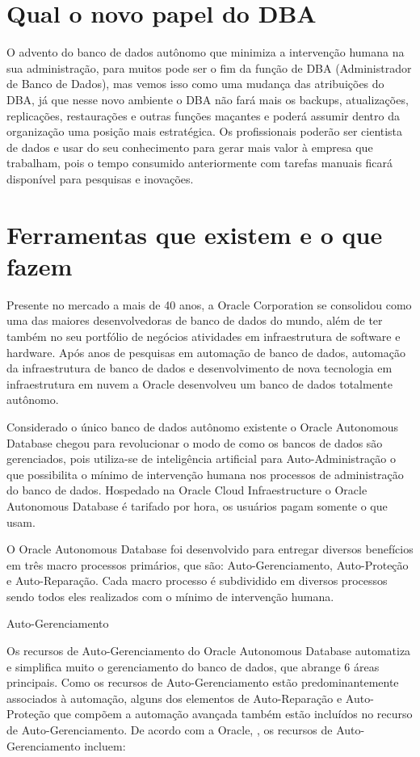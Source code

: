 \section{Qual o novo papel do DBA}

O advento do banco de dados autônomo que minimiza a intervenção humana na sua administração, para muitos pode ser o fim da função de DBA (Administrador de Banco de Dados), mas vemos isso como uma mudança das atribuições do DBA, já que nesse novo ambiente o DBA não fará mais os backups, atualizações, replicações, restaurações e outras funções maçantes e poderá assumir dentro da organização uma posição mais estratégica. Os profissionais poderão ser cientista de dados e usar do seu conhecimento para gerar mais valor à empresa que trabalham, pois o tempo consumido anteriormente com tarefas manuais ficará disponível para pesquisas e inovações.


\section{Ferramentas que existem e o que fazem}

Presente no mercado a mais de 40 anos, a Oracle Corporation se consolidou como uma das maiores desenvolvedoras de banco de dados do mundo, além de ter também no seu portfólio de negócios atividades em infraestrutura de software e hardware.  Após anos de pesquisas em automação de banco de dados, automação da infraestrutura de banco de dados e desenvolvimento de nova tecnologia em infraestrutura em nuvem a Oracle desenvolveu um banco de dados totalmente autônomo.

Considerado o único banco de dados autônomo existente o Oracle Autonomous Database chegou para revolucionar o modo de como os bancos de dados são gerenciados, pois utiliza-se de inteligência artificial para Auto-Administração o que possibilita o mínimo de intervenção humana nos processos de administração do banco de dados. Hospedado na Oracle Cloud Infraestructure o Oracle Autonomous Database é tarifado por hora, os usuários pagam somente o que usam.

O Oracle Autonomous Database foi desenvolvido para entregar diversos benefícios em três macro processos primários, que são: Auto-Gerenciamento, Auto-Proteção e Auto-Reparação. Cada macro processo é subdividido em diversos processos sendo todos eles realizados com o mínimo de intervenção humana.


Auto-Gerenciamento


Os recursos de Auto-Gerenciamento do Oracle Autonomous Database automatiza e simplifica muito o gerenciamento do banco de dados, que abrange 6 áreas principais. Como os recursos de Auto-Gerenciamento estão predominantemente associados à automação, alguns dos elementos de Auto-Reparação e Auto-Proteção que compõem a automação avançada também estão incluídos no recurso de Auto-Gerenciamento. De acordo com a Oracle, \cite{WPGestao}, os recursos de Auto-Gerenciamento incluem:

